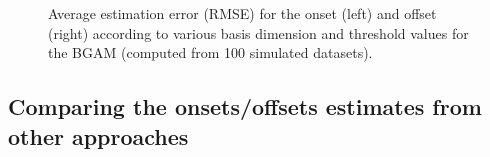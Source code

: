 \documentclass[
  doc,
  floatsintext,
  longtable,
  a4paper,
  nolmodern,
  notxfonts,
  notimes,
  donotrepeattitle,
  colorlinks=true,linkcolor=blue,citecolor=blue,urlcolor=blue]{apa7}
\begin{document}
\begin{figure}[!htb]

\caption{\label{fig-onset-error}Average estimation error (RMSE) for the
onset (left) and offset (right) according to various basis dimension and
threshold values for the BGAM (computed from 100 simulated datasets).}


\end{figure}%

\newpage

\subsection{Comparing the onsets/offsets estimates from other
approaches}\label{comparing-the-onsetsoffsets-estimates-from-other-approaches}
\end{document}
